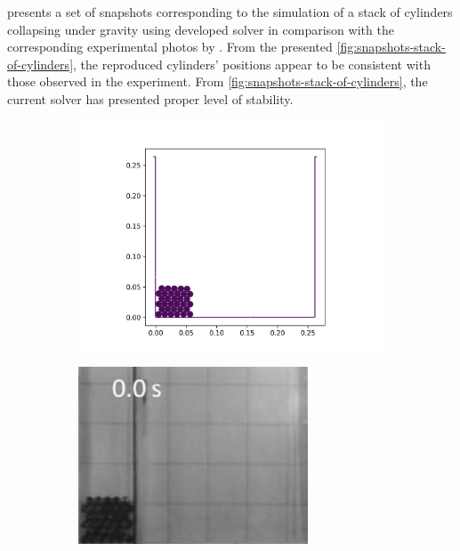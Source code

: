  presents a set of snapshots
corresponding to the simulation of a stack of cylinders collapsing under gravity
using developed solver in comparison with the corresponding experimental photos
by \citep{zhang_simulation_2009}. From the presented
\cref{fig:snapshots-stack-of-cylinders}, the reproduced cylinders' positions
appear to be consistent with those observed in the experiment. From
\cref{fig:snapshots-stack-of-cylinders}, the current solver has presented proper
level of stability.
\begin{figure}[!htpb]
  \centering
  \begin{subfigure}{0.48\textwidth}
    \centering
    \includegraphics[width=1.0\textwidth]{figures/rfc/figures/stack_of_cylinders_2d/Mohseni_Vyas/time0}
  \end{subfigure}
  \begin{subfigure}{0.48\textwidth}
    \centering
    \includegraphics[width=0.75\textwidth]{images/rfc/images/stack_of_cylinders_experimental_images/time0}
  \end{subfigure}


\end{figure}
